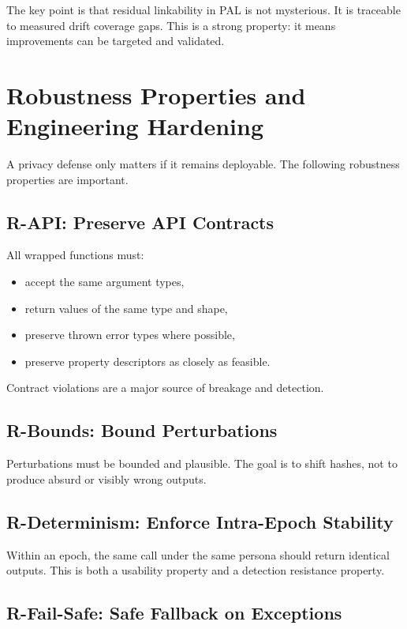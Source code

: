 \documentclass[11pt]{report}
\begin{document}
The key point is that residual linkability in PAL is not mysterious. It is traceable to measured drift coverage gaps. This is a strong property: it means improvements can be targeted and validated.

\section{Robustness Properties and Engineering Hardening}

A privacy defense only matters if it remains deployable. The following robustness properties are important.

\subsection{R-API: Preserve API Contracts}

All wrapped functions must:
\begin{itemize}
    \item accept the same argument types,
    \item return values of the same type and shape,
    \item preserve thrown error types where possible,
    \item preserve property descriptors as closely as feasible.
\end{itemize}

Contract violations are a major source of breakage and detection.

\subsection{R-Bounds: Bound Perturbations}

Perturbations must be bounded and plausible. The goal is to shift hashes, not to produce absurd or visibly wrong outputs.

\subsection{R-Determinism: Enforce Intra-Epoch Stability}

Within an epoch, the same call under the same persona should return identical outputs. This is both a usability property and a detection resistance property.

\subsection{R-Fail-Safe: Safe Fallback on Exceptions}
\end{document}
